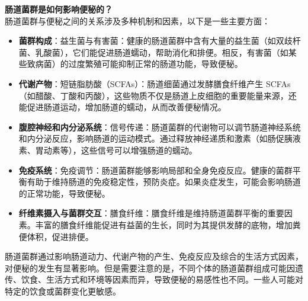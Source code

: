 \documentclass[UTF8]{ctexart}
\begin{document}
\begin{tcolorbox}[
    enhanced,
    colback=lightpurple!10, %
    colframe=lightpurple!10,  %
    arc=3mm,
    boxrule=0.5pt,
    width=\textwidth,
    top=8pt,
    bottom=8pt
]
{\small{\color{lightpurple}\faQuestionCircle}\quad \textbf{肠道菌群是如何影响便秘的？}\\
{\color{orange!50}\faComments}\quad 肠道菌群与便秘之间的关系涉及多种机制和因素，以下是一些主要方面：
\begin{itemize}
    \item \textbf{菌群构成}：益生菌与有害菌：健康的肠道菌群中含有大量的益生菌（如双歧杆菌、乳酸菌），它们能促进肠道蠕动，帮助消化和排便。相反，有害菌（如某些致病菌）的过度繁殖可能抑制正常的肠道功能，导致便秘。
    \item \textbf{代谢产物}：短链脂肪酸（SCFAs）：肠道细菌通过发酵膳食纤维产生 SCFAs（如醋酸、丁酸和丙酸），这些物质不仅是肠道上皮细胞的重要能量来源，还能促进肠道运动，增加肠道的蠕动，从而改善便秘情况。
    \item \textbf{腹腔神经和内分泌系统}：信号传递：肠道菌群的代谢物可以调节肠道神经系统和内分泌反应，影响肠道的运动模式。通过释放神经递质和激素（如肠促胰液素、胃动素等），这些信号可以增强肠道的蠕动。
    \item \textbf{免疫系统}：免疫调节：肠道菌群能够影响局部和全身免疫反应。健康的菌群平衡有助于维持肠道的免疫稳定性，预防炎症。如果炎症发生，可能会影响肠道的正常功能，导致便秘。
    \item \textbf{纤维素摄入与菌群交互}：膳食纤维：膳食纤维是维持肠道菌群平衡的重要因素。丰富的膳食纤维能促进有益菌的生长，同时为其提供发酵的底物，增加粪便体积，促进排便。
\end{itemize}
肠道菌群通过影响肠道动力、代谢产物的产生、免疫反应及综合的生活方式因素，对便秘的发生有显著影响。但是需要注意的是，不同个体的肠道菌群组成可能因遗传、饮食、生活方式和环境等因素而异，导致便秘的易感性也不同。一些人可能对特定的饮食或菌群变化更敏感。
}
\end{tcolorbox}

\newpage
\end{document}
